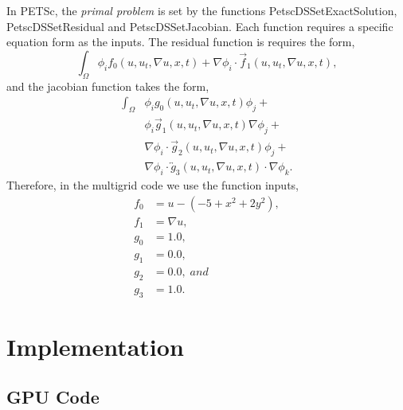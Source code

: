 \documentclass[]{article}
\theoremstyle{definition}
\begin{document}
In PETSc, the \textit{primal problem} is set by the functions PetscDSSetExactSolution, PetscDSSetResidual and PetscDSSetJacobian.  Each function requires a specific equation form as the inputs.  The residual function is requires the form,
\begin{equation}
\int_\Omega \phi_i f_0(u, u_t, \nabla u, x, t) + \nabla\phi_i \cdot {\vec f}_1(u, u_t, \nabla u, x, t),
\end{equation}
and the jacobian function takes the form,
\begin{equation}
\begin{split}
\int_\Omega &\phi_i g_0(u, u_t, \nabla u, x, t) \phi_j + \\
&\phi_i {\vec g}_1(u, u_t, \nabla u, x, t) \nabla \phi_j + \\
&\nabla\phi_i \cdot {\vec g}_2(u, u_t, \nabla u, x, t) \phi_j + \\
&\nabla\phi_i \cdot {\overleftrightarrow g}_3(u, u_t, \nabla u, x, t) \cdot \nabla \phi_k.
\end{split}
\end{equation}
Therefore, in the multigrid code we use the function inputs,
\begin{align}
f_0 &= u - (-5 + x^2 + 2 y^2), \\
f_1 &= \nabla u, \\
g_0 &= 1.0, \\
g_1 &= 0.0, \\
g_2 &= 0.0,\; and \\
g_3 &= 1.0.
\end{align}


\section{Implementation}



\subsection{GPU Code}



\printbibliography 
\end{document}
